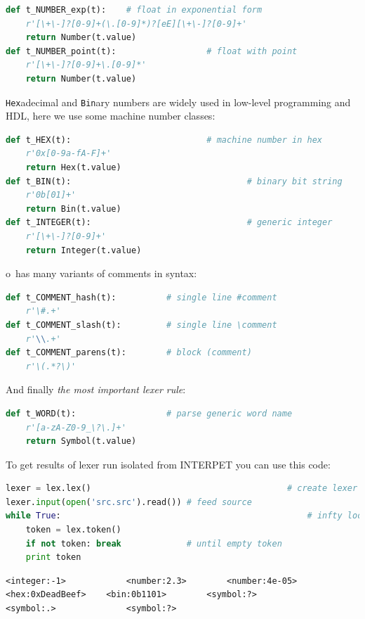 \medskip
\begin{lstlisting}[language=Python]
def t_NUMBER_exp(t):	# float in exponential form
	r'[\+\-]?[0-9]+(\.[0-9]*)?[eE][\+\-]?[0-9]+'
	return Number(t.value)
def t_NUMBER_point(t):					# float with point
	r'[\+\-]?[0-9]+\.[0-9]*'
	return Number(t.value)
\end{lstlisting}
\clearpage
\noindent \verb|Hex|adecimal and \verb|Bin|ary numbers are widely used in
low-level programming and HDL, here we use some machine number classes:
\begin{lstlisting}[language=Python]
def t_HEX(t):							# machine number in hex
    r'0x[0-9a-fA-F]+'
    return Hex(t.value)
def t_BIN(t):									# binary bit string
    r'0b[01]+'
    return Bin(t.value)
def t_INTEGER(t):								# generic integer
    r'[\+\-]?[0-9]+'
    return Integer(t.value)
\end{lstlisting}
\clearpage\noindent o\F\ has many variants of comments in syntax:
\begin{lstlisting}[language=Python]
def t_COMMENT_hash(t):			# single line #comment
	r'\#.+'
def t_COMMENT_slash(t):			# single line \comment
	r'\\.+'
def t_COMMENT_parens(t):		# block (comment)
	r'\(.*?\)'
\end{lstlisting}

\bigskip\noindent And finally \emph{the most important lexer rule}:
\begin{lstlisting}[language=Python]
def t_WORD(t): 					# parse generic word name
    r'[a-zA-Z0-9_\?\.]+'
    return Symbol(t.value)
\end{lstlisting}
\clearpage\noindent To get results of lexer run isolated from INTERPET you can
use this code:

\begin{lstlisting}[language=Python]
lexer = lex.lex()										# create lexer
lexer.input(open('src.src').read())	# feed source
while True:													# infty loop
    token = lex.token()
    if not token: break				# until empty token
    print token
\end{lstlisting}
\begin{lstlisting}
<integer:-1>			<number:2.3>		<number:4e-05>
<hex:0xDeadBeef>	<bin:0b1101>		<symbol:?>	
<symbol:.>				<symbol:?>
\end{lstlisting}

